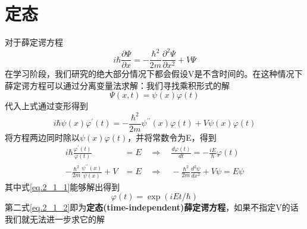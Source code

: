 \section{定态}
	对于薛定谔方程
	\begin{equation}
	i \hbar \frac{\partial \Psi}{\partial x}=-\frac{\hbar^{2}}{2 m} \frac{\partial^{2} \Psi}{\partial x^{2}}+V \Psi
	\end{equation}
	在学习阶段，我们研究的绝大部分情况下都会假设V是不含时间的。在这种情况下薛定谔方程可以通过分离变量法求解：我们寻找乘积形式的解
	\begin{equation}
	\Psi(x,t)=\psi(x) \varphi(t)
	\end{equation} 
	代入上式通过变形得到
	\begin{equation}
	i \hbar \psi(x) \varphi^{\prime}(t)= -\frac{\hbar^2}{2m}\psi^{\prime \prime}(x) \varphi(t)+V \psi(x)\varphi(t)
	\end{equation}
	将方程两边同时除以$\psi(x) \varphi(t)$，并将常数令为E，得到
	\begin{align}
	\label{eq.2_1_1}
	i \hbar \frac{\varphi^{\prime}(t)}{\varphi(t)}&=E \quad \Rightarrow \quad \frac{d \varphi(t)}{d t}=-\frac{i E}{\hbar} \varphi(t) \\
	\label{eq.2_1_2}
	-\frac{\hbar^{2}}{2 m} \frac{\psi^{\prime \prime}(x)}{\psi(x)}+V&=E \quad \Rightarrow \quad -\frac{\hbar^{2}}{2 m} \frac{d^{2} \psi}{d x^{2}}+V \psi=E \psi
	\end{align}
	其中式\ref{eq.2_1_1}能够解出得到
	\begin{equation}
	\varphi(t) = \exp(iEt/\hbar)
	\end{equation}
	第二式\ref{eq.2_1_2}即为\textbf{定态(time-independent)薛定谔方程}，如果不指定V的话我们就无法进一步求它的解

